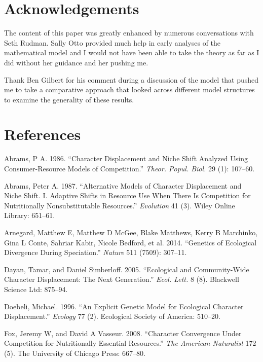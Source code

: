 \documentclass[11pt,]{article}
\begin{document}
\section{Acknowledgements}\label{acknowledgements}

The content of this paper was greatly enhanced by numerous conversations
with Seth Rudman. Sally Otto provided much help in early analyses of the
mathematical model and I would not have been able to take the theory as
far as I did without her guidance and her pushing me.

Thank Ben Gilbert for his comment during a discussion of the model that
pushed me to take a comparative approach that looked across different
model structures to examine the generality of these results.

\section{References}\label{references}

\hypertarget{refs}{}
\hypertarget{ref-Abrams1986}{}
Abrams, P A. 1986. ``Character Displacement and Niche Shift Analyzed
Using Consumer-Resource Models of Competition.'' \emph{Theor. Popul.
Biol.} 29 (1): 107--60.

\hypertarget{ref-Abrams1987}{}
Abrams, Peter A. 1987. ``Alternative Models of Character Displacement
and Niche Shift. I. Adaptive Shifts in Resource Use When There Is
Competition for Nutritionally Nonsubstitutable Resources.''
\emph{Evolution} 41 (3). Wiley Online Library: 651--61.

\hypertarget{ref-Arnegard2014}{}
Arnegard, Matthew E, Matthew D McGee, Blake Matthews, Kerry B Marchinko,
Gina L Conte, Sahriar Kabir, Nicole Bedford, et al. 2014. ``Genetics of
Ecological Divergence During Speciation.'' \emph{Nature} 511 (7509):
307--11.

\hypertarget{ref-Dayan2005}{}
Dayan, Tamar, and Daniel Simberloff. 2005. ``Ecological and
Community-Wide Character Displacement: The Next Generation.''
\emph{Ecol. Lett.} 8 (8). Blackwell Science Ltd: 875--94.

\hypertarget{ref-Doebeli1996}{}
Doebeli, Michael. 1996. ``An Explicit Genetic Model for Ecological
Character Displacement.'' \emph{Ecology} 77 (2). Ecological Society of
America: 510--20.

\hypertarget{ref-Fox2008}{}
Fox, Jeremy W, and David A Vasseur. 2008. ``Character Convergence Under
Competition for Nutritionally Essential Resources.'' \emph{The American
Naturalist} 172 (5). The University of Chicago Press: 667--80.
\end{document}
